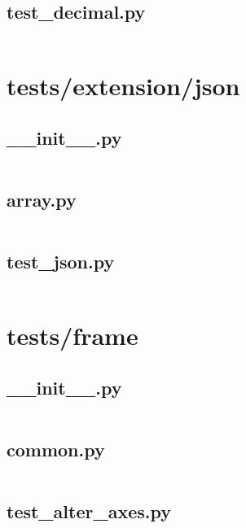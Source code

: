 \documentclass{article}
\begin{document}
\subsection{test\_decimal.py}
\inputminted{python}{/home/dufferzafar/dev/@clones/pandas/pandas/tests/extension/decimal/test_decimal.py}
\newpage

\section{tests/extension/json}

\subsection{\_\_init\_\_.py}
\inputminted{python}{/home/dufferzafar/dev/@clones/pandas/pandas/tests/extension/json/__init__.py}
\newpage

\subsection{array.py}
\inputminted{python}{/home/dufferzafar/dev/@clones/pandas/pandas/tests/extension/json/array.py}
\newpage

\subsection{test\_json.py}
\inputminted{python}{/home/dufferzafar/dev/@clones/pandas/pandas/tests/extension/json/test_json.py}
\newpage

\section{tests/frame}

\subsection{\_\_init\_\_.py}
\inputminted{python}{/home/dufferzafar/dev/@clones/pandas/pandas/tests/frame/__init__.py}
\newpage

\subsection{common.py}
\inputminted{python}{/home/dufferzafar/dev/@clones/pandas/pandas/tests/frame/common.py}
\newpage

\subsection{test\_alter\_axes.py}
\inputminted{python}{/home/dufferzafar/dev/@clones/pandas/pandas/tests/frame/test_alter_axes.py}
\newpage
\end{document}

